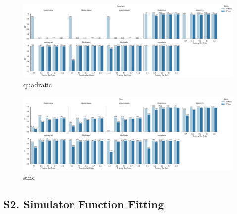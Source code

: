 \documentclass[journal=jacsat,manuscript=article]{achemso}
\begin{document}
\begin{figure}[H]
	\centering
	\includegraphics[width=\linewidth]{images/quadratic.png}
	\caption{quadratic}
	\label{fig:quadratic}
\end{figure}

\begin{figure}[H]
	\centering
	\includegraphics[width=\linewidth]{images/sine.png}
	\caption{sine}
	\label{fig:sine}
\end{figure}


\newpage
\subsection*{S2. Simulator Function Fitting}\label{SI_subsection:Simulator_Function_Fitting}
\end{document}
